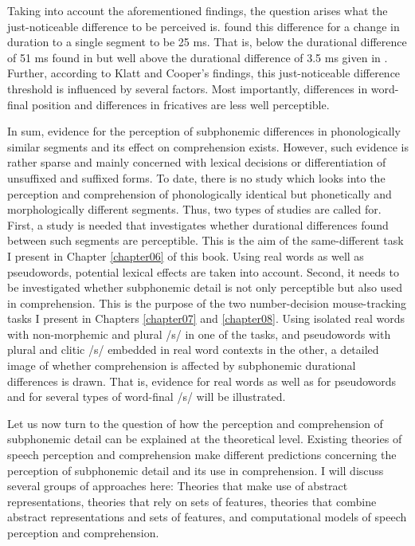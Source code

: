 Taking into account the aforementioned findings, the question arises what the just-noticeable difference to be perceived is. \citet{Klatt1975} found this difference for a change in duration to a single segment to be 25 ms. That is, below the durational difference of 51 ms found in \citet{Shatzman2006} but well above the durational difference of 3.5 ms given in \citet{Warner2004}. Further, according to Klatt and Cooper’s findings, this just-noticeable difference threshold is influenced by several factors. Most importantly, differences in word-final position and differences in fricatives are less well perceptible. 

In sum, evidence for the perception of subphonemic differences in phonologically similar segments and its effect on comprehension exists. However, such evidence is rather sparse and mainly concerned with lexical decisions or differentiation of unsuffixed and suffixed forms. To date, there is no study which looks into the perception and comprehension of phonologically identical but phonetically and morphologically different segments. Thus, two types of studies are called for. First, a study is needed that investigates whether durational differences found between such segments are perceptible. This is the aim of the same-different task I present in Chapter \ref{chapter06} of this book. Using real words as well as pseudowords, potential lexical effects are taken into account. Second, it needs to be investigated whether subphonemic detail is not only perceptible but also used in comprehension. This is the purpose of the two number-decision mouse-tracking tasks I present in Chapters \ref{chapter07} and \ref{chapter08}. Using isolated real words with non-morphemic and plural /s/ in one of the tasks, and pseudowords with plural and clitic /s/ embedded in real word contexts in the other, a detailed image of whether comprehension is affected by subphonemic durational differences is drawn. That is, evidence for real words as well as for pseudowords and for several types of word-final /s/ will be illustrated.

Let us now turn to the question of how the perception and comprehension of subphonemic detail can be explained at the theoretical level. Existing theories of speech perception and comprehension make different predictions concerning the perception of subphonemic detail and its use in comprehension. I will discuss several groups of approaches here: Theories that make use of abstract representations, theories that rely on sets of features, theories that combine abstract representations and sets of features, and computational models of speech perception and comprehension.

